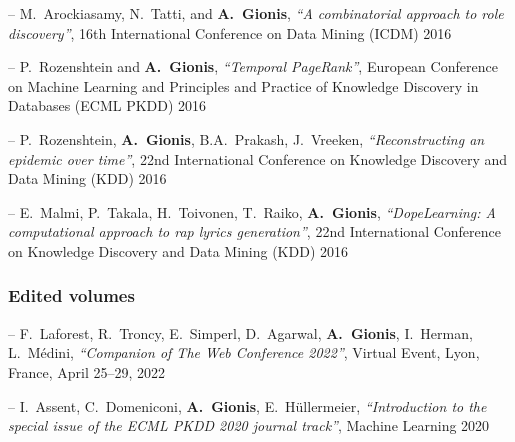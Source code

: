 \documentclass[a4paper,11pt]{article}
\begin{document}
\item[--] 
{M.\ Arockiasamy, N.\ Tatti, and \textbf{A.\ Gionis}},
{\em ``A combinatorial approach to role discovery''}, 
16th International Conference on Data Mining (ICDM) 2016

\item[--] 
{P.\ Rozenshtein and \textbf{A.\ Gionis}},
{\em ``Temporal PageRank''}, 
European Conference on Machine Learning and Principles and Practice of Knowledge Discovery in Databases (ECML PKDD) 2016

\item[--] 
{P.\ Rozenshtein, \textbf{A.\ Gionis}, B.A.\ Prakash, J.\ Vreeken},
{\em ``Reconstructing an epidemic over time''}, 
22nd International Conference on Knowledge Discovery and Data Mining (KDD) 2016

\item[--] 
{E.\ Malmi, P.\ Takala, H.\ Toivonen, T.\ Raiko, \textbf{A.\ Gionis}}, 
{\em ``DopeLearning: A computational approach to rap lyrics generation''}, 
22nd International Conference on Knowledge Discovery and Data Mining (KDD) 2016



\biblistend

	
\subsubsection*{{Edited volumes}}

\biblist

\item[--]
{F.\ Laforest, R.\ Troncy, E.\ Simperl, D.\ Agarwal, \textbf{A.\ Gionis}, I.\ Herman, L.\ Médini},
{\em ``Companion of The Web Conference 2022''}, 
Virtual Event, Lyon, France, April 25--29, 2022

\item[--]
{I.\ Assent, C.\ Domeniconi, \textbf{A.\ Gionis}, E.\ Hüllermeier},
{\em ``Introduction to the special issue of the ECML PKDD 2020 journal track''},
Machine Learning 2020

\biblistend
\end{document}
